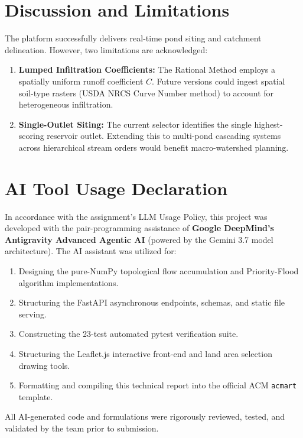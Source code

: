 \documentclass[manuscript,screen,review]{acmart}
\begin{document}
\section{Discussion and Limitations}
\label{sec:discussion}
The platform successfully delivers real-time pond siting and catchment delineation. However, two limitations are acknowledged:
\begin{enumerate}[noitemsep]
    \item \textbf{Lumped Infiltration Coefficients:} The Rational Method employs a spatially uniform runoff coefficient $C$. Future versions could ingest spatial soil-type rasters (USDA NRCS Curve Number method) to account for heterogeneous infiltration.
    \item \textbf{Single-Outlet Siting:} The current selector identifies the single highest-scoring reservoir outlet. Extending this to multi-pond cascading systems across hierarchical stream orders would benefit macro-watershed planning.
\end{enumerate}

\section{AI Tool Usage Declaration}
\label{sec:ai-usage}
In accordance with the assignment's LLM Usage Policy, this project was developed with the pair-programming assistance of \textbf{Google DeepMind's Antigravity Advanced Agentic AI} (powered by the Gemini 3.7 model architecture). The AI assistant was utilized for:
\begin{enumerate}[noitemsep]
    \item Designing the pure-NumPy topological flow accumulation and Priority-Flood algorithm implementations.
    \item Structuring the FastAPI asynchronous endpoints, schemas, and static file serving.
    \item Constructing the 23-test automated pytest verification suite.
    \item Structuring the Leaflet.js interactive front-end and land area selection drawing tools.
    \item Formatting and compiling this technical report into the official ACM \texttt{acmart} template.
\end{enumerate}
All AI-generated code and formulations were rigorously reviewed, tested, and validated by the team prior to submission.
\end{document}

